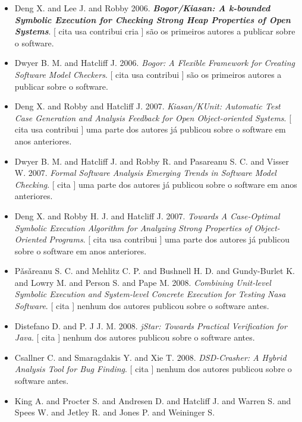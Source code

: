 \begin{itemize}
\item Deng X. and Lee J. and Robby
      2006.
        \textbf{\textit{ Bogor/Kiasan: A k-bounded Symbolic Execution for Checking Strong Heap Properties of Open Systems}}.
      [
          cita
          usa
          contribui
          cria
      ]
são os primeiros autores a publicar sobre o software.
\item Dwyer B. M. and Hatcliff J.
      2006.
        \textit{ Bogor: A Flexible Framework for Creating Software Model Checkers}.
      [
          cita
          usa
          contribui
      ]
são os primeiros autores a publicar sobre o software.
\item Deng X. and Robby and Hatcliff J.
      2007.
        \textit{ Kiasan/KUnit: Automatic Test Case Generation and Analysis Feedback for Open Object-oriented Systems}.
      [
          cita
          usa
          contribui
      ]
uma parte dos autores já publicou sobre o software em anos anteriores.
\item Dwyer B. M. and Hatcliff J. and Robby R. and Pasareanu S. C. and Visser W.
      2007.
        \textit{ Formal Software Analysis Emerging Trends in Software Model Checking}.
      [
          cita
      ]
uma parte dos autores já publicou sobre o software em anos anteriores.
\item Deng X. and Robby H. J. and Hatcliff J.
      2007.
        \textit{ Towards A Case-Optimal Symbolic Execution Algorithm for Analyzing Strong Properties of Object-Oriented Programs}.
      [
          cita
          usa
          contribui
      ]
uma parte dos autores já publicou sobre o software em anos anteriores.
\item P\v{a}s\v{a}reanu S. C. and Mehlitz C. P. and Bushnell H. D. and Gundy-Burlet K. and Lowry M. and Person S. and Pape M.
      2008.
        \textit{ Combining Unit-level Symbolic Execution and System-level Concrete Execution for Testing Nasa Software}.
      [
          cita
      ]
nenhum dos autores publicou sobre o software antes.
\item Distefano D. and P. J J. M.
      2008.
        \textit{ jStar: Towards Practical Verification for Java}.
      [
          cita
      ]
nenhum dos autores publicou sobre o software antes.
\item Csallner C. and Smaragdakis Y. and Xie T.
      2008.
        \textit{ DSD-Crasher: A Hybrid Analysis Tool for Bug Finding}.
      [
          cita
      ]
nenhum dos autores publicou sobre o software antes.
\item King A. and Procter S. and Andresen D. and Hatcliff J. and Warren S. and Spees W. and Jetley R. and Jones P. and Weininger S.

\end{itemize}
